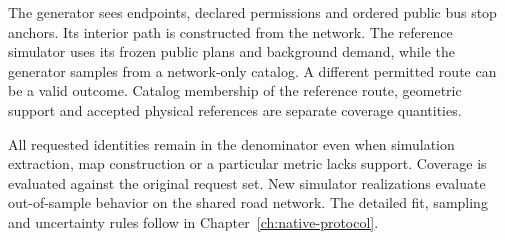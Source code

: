 The generator sees endpoints, declared permissions and ordered public bus stop anchors. Its interior path is constructed from the network. The reference simulator uses its frozen public plans and background demand, while the generator samples from a network-only catalog. A different permitted route can be a valid outcome. Catalog membership of the reference route, geometric support and accepted physical references are separate coverage quantities.

All requested identities remain in the denominator even when simulation extraction, map construction or a particular metric lacks support. Coverage is evaluated against the original request set. New simulator realizations evaluate out-of-sample behavior on the shared road network. The detailed fit, sampling and uncertainty rules follow in Chapter~\ref{ch:native-protocol}.
